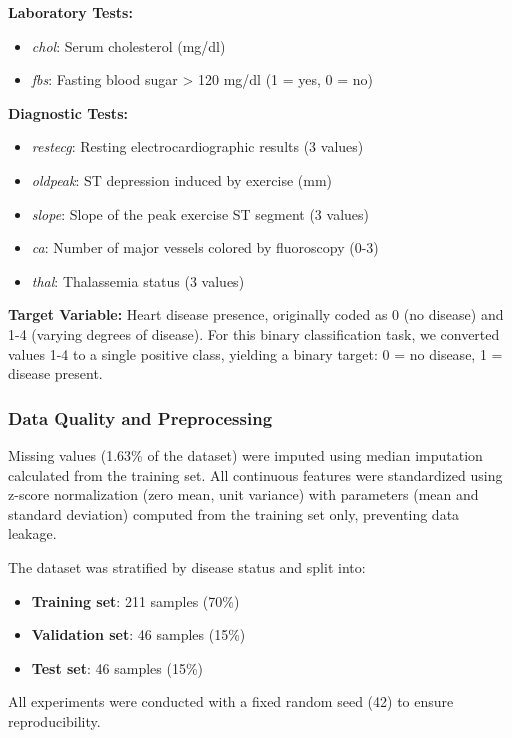 \documentclass[journal]{IEEEtran}
\begin{document}
\textbf{Laboratory Tests:}
\begin{itemize}
    \item \textit{chol}: Serum cholesterol (mg/dl)
    \item \textit{fbs}: Fasting blood sugar > 120 mg/dl (1 = yes, 0 = no)
\end{itemize}

\textbf{Diagnostic Tests:}
\begin{itemize}
    \item \textit{restecg}: Resting electrocardiographic results (3 values)
    \item \textit{oldpeak}: ST depression induced by exercise (mm)
    \item \textit{slope}: Slope of the peak exercise ST segment (3 values)
    \item \textit{ca}: Number of major vessels colored by fluoroscopy (0-3)
    \item \textit{thal}: Thalassemia status (3 values)
\end{itemize}

\textbf{Target Variable:} Heart disease presence, originally coded as 0 (no disease) and 1-4 (varying degrees of disease). For this binary classification task, we converted values 1-4 to a single positive class, yielding a binary target: 0 = no disease, 1 = disease present.

\subsubsection{Data Quality and Preprocessing}

Missing values (1.63\% of the dataset) were imputed using median imputation calculated from the training set. All continuous features were standardized using z-score normalization (zero mean, unit variance) with parameters (mean and standard deviation) computed from the training set only, preventing data leakage.

The dataset was stratified by disease status and split into:
\begin{itemize}
    \item \textbf{Training set}: 211 samples (70\%)
    \item \textbf{Validation set}: 46 samples (15\%)
    \item \textbf{Test set}: 46 samples (15\%)
\end{itemize}

All experiments were conducted with a fixed random seed (42) to ensure reproducibility.
\end{document}
